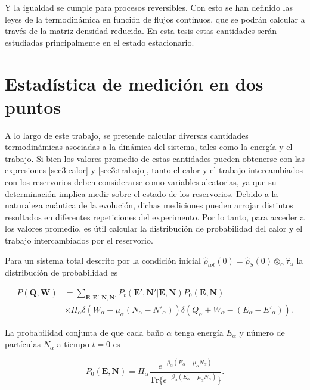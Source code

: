 Y la igualdad se cumple para procesos reversibles. Con esto se han definido las leyes de la termodinámica en función de flujos continuos, que se podrán calcular a través de la matriz densidad reducida. En esta tesis estas cantidades serán estudiadas principalmente en el estado estacionario.

\label{sec3sub:leyestermo}

\section{Estadística de medición en dos puntos}
A lo largo de este trabajo, se pretende calcular diversas cantidades termodinámicas asociadas a la dinámica del sistema, tales como la energía y el trabajo. Si bien los valores promedio de estas cantidades pueden obtenerse con las expresiones \ref{sec3:calor} y \ref{sec3:trabajo}, tanto el calor y el trabajo intercambiados con los reservorios deben considerarse como variables aleatorias, ya que su determinación implica medir sobre el estado de los reservorios. Debido a la naturaleza cuántica de la evolución, dichas mediciones pueden arrojar distintos resultados en diferentes repeticiones del experimento. Por lo tanto, para acceder a los valores promedio, es útil calcular la distribución de probabilidad del calor y el trabajo intercambiados por el reservorio.

Para  un sistema total descrito por la condición inicial $\hat{\rho}_{tot}(0) = \hat{\rho}_{S}(0) \otimes_{\alpha} \hat{\tau}_{\alpha}$ la distribución de probabilidad es   

\begin{align*}
    P(\textbf{Q},\textbf{W}) & = \sum_{\textbf{E},\textbf{E}',\textbf{N},\textbf{N}'} P_{t}(\textbf{E}',\textbf{N}'|\textbf{E},\textbf{N}) P_{0}(\textbf{E},\textbf{N})\\
                             & \times \Pi_{\alpha} \delta(W_{\alpha} - \mu_{\alpha}(N_{\alpha} - N'_{\alpha})) \delta(Q_{\alpha} + W_{\alpha}  - (E_{\alpha} - E'_{\alpha})).   
\end{align*}

La probabilidad conjunta de que cada baño $\alpha$ tenga energía $E_{\alpha}$ y número de partículas $N_{\alpha}$ a tiempo $t=0$ es

\begin{equation*}
    P_{0}(\textbf{E},\textbf{N}) = \Pi_{\alpha}  \frac{e^{-\beta_{\alpha}(E_{\alpha} - \mu_{\alpha}N_{\alpha} )  }}{ \text{Tr}\{e^{-\beta_{\alpha}(E_{\alpha} - \mu_{\alpha}N_{\alpha} )  }\} }.
\end{equation*}

